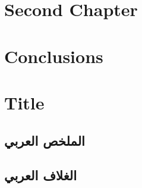 \documentclass[12pt,MSc]{tuthesis} %
\begin{document}
\chapter{Second Chapter}

\chapter{Conclusions}






\appendix
\singlespacing
\chapter[App. 1]{Title \label{appendex1}}

\begin{Arabic}
\chapter{الملخص العربي}

\end{Arabic}

\begin{Arabic}
\chapter{الغلاف العربي}

\end{Arabic}
\end{document}
